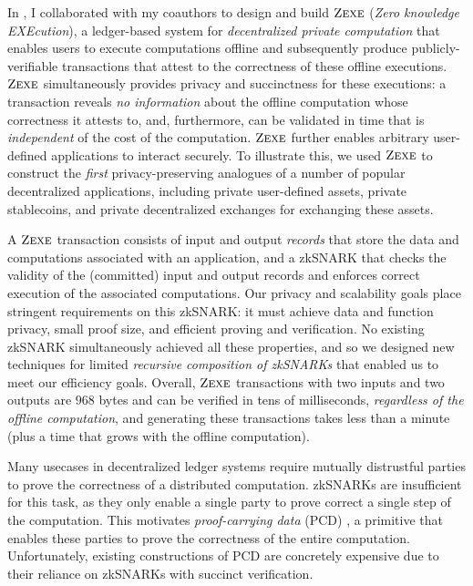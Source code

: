 \documentclass[11pt,letterpaper]{article}
\theoremstyle{definition} %
\theoremstyle{remark} %
\newcommand{\zexe}{\textsc{Zexe}}
\begin{document}
\parhead{\zexe{}: Enabling decentralized private computation}
In \cite{BoweCGMMW20}, I collaborated with my coauthors to design and build $\zexe$ (\emph{Zero knowledge EXEcution}), a ledger-based system for \emph{decentralized private computation} that enables users to execute computations offline and subsequently produce publicly-verifiable transactions that attest to the correctness of these offline executions. $\zexe$ simultaneously provides privacy and succinctness for these executions: a transaction reveals \emph{no information} about the offline computation whose correctness it attests to, and, furthermore, can be validated in time that is \emph{independent} of the cost of the computation. $\zexe$ further enables arbitrary user-defined applications to interact securely. To illustrate this, we used $\zexe$ to construct the \emph{first} privacy-preserving analogues of a number of popular decentralized applications, including private user-defined assets, private stablecoins, and private decentralized exchanges for exchanging these assets.

A $\zexe$ transaction consists of input and output \emph{records} that store the data and computations associated with an application, and a zkSNARK that checks the validity of the (committed) input and output records and enforces correct execution of the associated computations. Our privacy and scalability goals place stringent requirements on this zkSNARK: it must achieve data and function privacy, small proof size, and efficient proving and verification. No existing zkSNARK simultaneously achieved all these properties, and so we designed new techniques for limited \emph{recursive composition of zkSNARKs} that enabled us to meet our efficiency goals. Overall, $\zexe$ transactions with two inputs and two outputs are $968$ bytes and can be verified in tens of milliseconds, \emph{regardless of the offline computation}, and generating these transactions takes less than a minute (plus a time that grows with the offline computation). 

\label{sec:intro-pcd}
Many usecases in decentralized ledger systems require mutually distrustful parties to prove the correctness of a distributed computation. zkSNARKs are insufficient for this task, as they only enable a single party to prove correct a single step of the computation. This motivates \emph{proof-carrying data} (PCD) \cite{ChiesaT10}, a primitive that enables these parties to prove the correctness of the entire computation. Unfortunately, existing constructions of PCD \cite{ChiesaT10, BCCT12, BenSassonCTV17, ChiesaOS20} are concretely expensive due to their reliance on zkSNARKs with succinct verification. 
\end{document}
